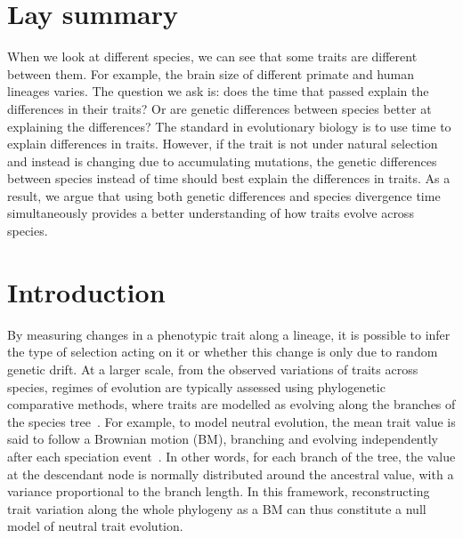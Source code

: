 \documentclass{article}
\begin{document}
\section*{Lay summary}\label{sec:summary}
When we look at different species, we can see that some traits are different between them.
For example, the brain size of different primate and human lineages varies.
The question we ask is: does the time that passed explain the differences in their traits?
Or are genetic differences between species better at explaining the differences?
The standard in evolutionary biology is to use time to explain differences in traits.
However, if the trait is not under natural selection and instead is changing due to accumulating mutations, the genetic differences between species instead of time should best explain the differences in traits.
As a result, we argue that using both genetic differences and species divergence time simultaneously provides a better understanding of how traits evolve across species.

\section*{Introduction}\label{sec:introduction}
By measuring changes in a phenotypic trait along a lineage, it is possible to infer the type of selection acting on it or whether this change is only due to random genetic drift.
At a larger scale, from the observed variations of traits across species, regimes of evolution are typically assessed using phylogenetic comparative methods, where traits are modelled as evolving along the branches of the species tree~\citep{felsenstein_phylogenies_1985, felsenstein_phylogenies_1988a, harmon_phylogenetic_2018}.
For example, to model neutral evolution, the mean trait value is said to follow a Brownian motion (BM), branching and evolving independently after each speciation event~\citep{felsenstein_phylogenies_1985, lynch_phenotypic_1986, hansen_translating_1996}.
In other words, for each branch of the tree, the value at the descendant node is normally distributed around the ancestral value, with a variance proportional to the branch length.
In this framework, reconstructing trait variation along the whole phylogeny as a BM can thus constitute a null model of neutral trait evolution.
\end{document}
